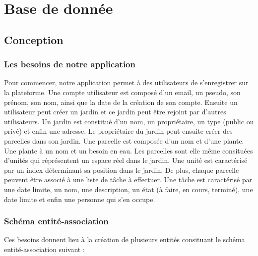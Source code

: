 \documentclass[french,a4paper]{article}
\begin{document}
\section{Base de donnée}
\subsection{Conception}
\subsubsection{Les besoins de notre application}
Pour commencer, notre application permet à des utilisateurs de s'enregistrer sur la plateforme. Une compte utilisateur est composé d'un 
email, un pseudo, son prénom, son nom, ainsi que la date de la création de son compte. Ensuite un utilisateur peut créer un jardin
et ce jardin peut être rejoint par d'autres utilisateurs.
Un jardin est constitué d'un nom, un propriétaire, un type (public ou privé) et enfin une adresse. Le propriétaire du jardin peut 
ensuite créer des parcelles dans son jardin. Une parcelle est composée d'un nom et d'une plante. Une plante à un nom et un besoin en eau. Les parcelles sont elle même consituées
d'unités qui réprésentent un espace réel dans le jardin. Une unité est caractérisé par un index déterminant sa position dans le jardin.
De plus, chaque parcelle peuvent être associé à une liste de tâche à effectuer. Une tâche est caractérisé par une date limite, un nom, 
une description, un état (à faire, en cours, terminé), une date limite et enfin une personne qui s'en occupe.

\subsubsection{Schéma entité-association}

Ces besoins donnent lieu à la création de plusieurs entités consituant le schéma entité-association suivant :
\end{document}
